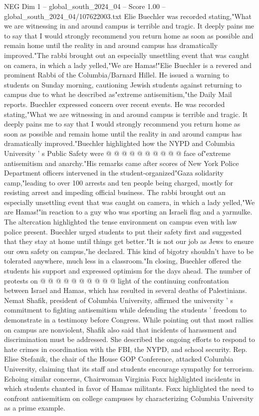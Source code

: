 \begin{textsample}{NEG Dim 1 – global\_south\_2024\_04 – Score 1.00 – global\_south\_2024\_04/107622003.txt}  \label{ex:f1_neg_301}
Elie Buechler was recorded stating,"What we are witnessing in and around campus is terrible and tragic.
It deeply pains me to say that I would strongly recommend you return home as soon as possible and remain home until the reality in and around campus has dramatically improved."The rabbi brought out an especially unsettling event that was caught on camera, in which a lady yelled,"We are Hamas!"Elie Buechler is a revered and prominent Rabbi of the Columbia/Barnard Hillel.
He issued a warning to students on Sunday morning, cautioning Jewish students against returning to campus due to what he described as"extreme antisemitism,"the Daily Mail reports.
Buechler expressed concern over recent events.
He was recorded stating,"What we are witnessing in and around campus is terrible and tragic.
It deeply pains me to say that I would strongly recommend you return home as soon as possible and remain home until the reality in and around campus has dramatically improved."Buechler highlighted how the NYPD and Columbia University ' s Public Safety were @ @ @ @ @ @ @ @ @ @ face of"extreme antisemitism and anarchy."His remarks came after scores of New York Police Department officers intervened in the student-organized"Gaza solidarity camp,"leading to over 100 arrests and ten people being charged, mostly for resisting arrest and impeding official business.
The rabbi brought out an especially unsettling event that was caught on camera, in which a lady yelled,"We are Hamas!"in reaction to a guy who was sporting an Israeli flag and a yarmulke.
The altercation highlighted the tense environment on campus even with law police present.
Buechler urged students to put their safety first and suggested that they stay at home until things get better."It is not our job as Jews to ensure our own safety on campus,"he declared.
This kind of bigotry shouldn't have to be tolerated anywhere, much less in a classroom."In closing, Buechler offered the students his support and expressed optimism for the days ahead.
The number of protests on @ @ @ @ @ @ @ @ @ @ light of the continuing confrontation between Israel and Hamas, which has resulted in several deaths of Palestinians.
Nemat Shafik, president of Columbia University, affirmed the university ' s commitment to fighting antisemitism while defending the students ' freedom to demonstrate in a testimony before Congress.
While pointing out that most rallies on campus are nonviolent, Shafik also said that incidents of harassment and discrimination must be addressed.
She described the ongoing efforts to respond to hate crimes in coordination with the FBI, the NYPD, and school security.
Rep.
Elise Stefanik, the chair of the House GOP Conference, attacked Columbia University, claiming that its staff and students encourage sympathy for terrorism.
Echoing similar concerns, Chairwoman Virginia Foxx highlighted incidents in which students chanted in favor of Hamas militants.
Foxx highlighted the need to confront antisemitism on college campuses by characterizing Columbia University as a prime example.

\end{textsample}
